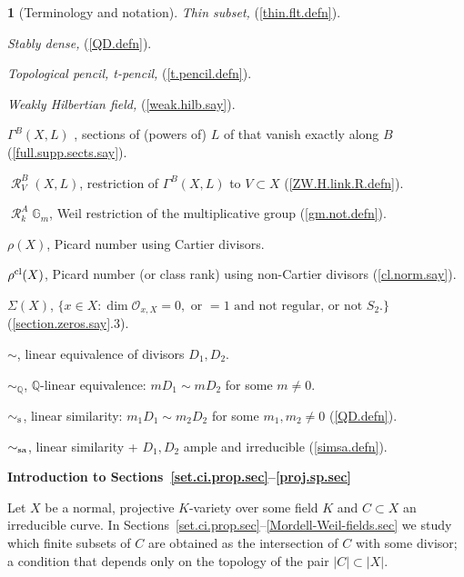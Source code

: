 \documentclass{amsart}
\theoremstyle{definition}
\newtheorem{say}[thm]{}
\theoremstyle{remark}
\renewcommand{\o}[0]{{\mathcal O}}
\newcommand{\q}[0]{{\mathbb Q}}
\newcommand{\res}[0]{\operatorname{\mathcal R}}
\newcommand{\simq}[0]{\sim_{\q}}
\newcommand{\gm}[0]{{\mathbb G}_m}
\newcommand{\sims}[0]{\sim_{\rm s}}
\newcommand{\simsa}[0]{\sim_{\rm sa}}
\begin{document}
\begin{say}[Terminology and notation]
{\it Thin subset,}   (\ref{thin.flt.defn}). 

{\it Stably dense,}  (\ref{QD.defn}). 

{\it Topological pencil, t-pencil,}  (\ref{t.pencil.defn}). 

{\it Weakly Hilbertian field,}  (\ref{weak.hilb.say}).



 $\Gamma^B(X,L)$ , sections of (powers of) $L$ of that vanish exactly along $B$  (\ref{full.supp.sects.say}). 

$\res_V^B(X,L)$,   restriction of $\Gamma^B(X,L)$ to $V\subset X$  (\ref{ZW.H.link.R.defn}). 

$\res^A_k\gm$,   Weil restriction of the multiplicative group (\ref{gm.not.defn}). 

$\rho(X)$,  Picard number using Cartier divisors.

$\rho^{\rm cl}(X)$, Picard number (or class rank) using non-Cartier divisors (\ref{cl.norm.say}).

$\Sigma(X)$, $\{x\in X: \dim\o_{x,X}=0, \mbox{ or } =1 \mbox{ and   not regular, or not } S_2.\}$  (\ref{section.zeros.say}.3).

$\sim$,  linear equivalence of divisors $D_1, D_2$.

$\simq$,  $\q$-linear equivalence:  $mD_1\sim mD_2$ for some $m\neq  0$.

$\sims$,  linear similarity: $m_1D_1\sim m_2D_2$ for some $m_1, m_2\neq  0$ (\ref{QD.defn}). 

$\simsa$,  linear similarity +  $D_1, D_2$ ample and irreducible (\ref{simsa.defn}).
\end{say}

\medskip
{\bf Introduction to Sections~\ref{set.ci.prop.sec}--\ref{proj.sp.sec}}
\medskip
  
Let $X$ be a normal, projective  $K$-variety over some field $K$ and
$C\subset X$ an irreducible curve. In Sections~\ref{set.ci.prop.sec}--\ref{Mordell-Weil-fields.sec}
we study which finite subsets of $C$ are obtained as the intersection of $C$ with some divisor; a condition that depends only on the topology of the pair $|C|\subset |X|$. 
\end{document}
